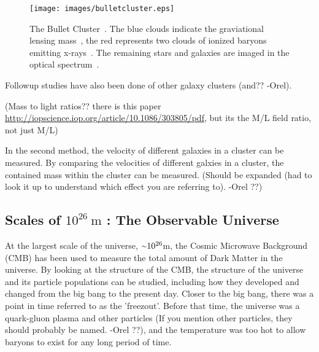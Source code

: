     \begin{figure}[ht]
      \centering
      \texttt{[image: images/bulletcluster.eps]}
      \caption[The Bullet Cluster]{
        The Bullet Cluster~\cite{bullet_cluster_combined_image}.
        The blue clouds indicate the graviational lensing mass~\cite{bullet_cluster}, the red represents two clouds of ionized baryons emitting x-rays~\cite{bullet_cluster_chandramap}.
        The remaining stars and galaxies are imaged in the optical spectrum~\cite{bullet_cluster_composite}.}
      \label{fig:bullet}
    \end{figure}

    Followup studies have also been done of other galaxy clusters {\color{red}(and?? -Orel)}.

    {\color{red}(Mass to light ratios?? there is this paper \url{http://iopscience.iop.org/article/10.1086/303805/pdf}, but its the M/L field ratio, not just M/L)}

    In the second method, the velocity of different galaxies in a cluster can be measured.
    By comparing the velocities of different galxies in a cluster, the contained mass within the cluster can be measured.
    {\color{red}(Should be expanded (had to look it up to understand which effect you are referring to). -Orel ??)}

  \subsection{Scales of $10^{26}\:\text{m}$ : The Observable Universe}\label{dm_universe}
    At the largest scale of the universe, $\nicetilde 10^{26}$m, the Cosmic Microwave Background (CMB) has been used to measure the total amount of Dark Matter in the universe.
    By looking at the structure of the CMB, the structure of the universe and its particle populations can be studied, including how they developed and changed from the big bang to the present day.
    Closer to the big bang, there was a point in time referred to as the 'freezout'.
    Before that time, the universe was a quark-gluon plasma {\color{red}and other particles (If you mention other particles, they should probably be named. -Orel ??)}, and the temperature was too hot to allow baryons to exist for any long period of time.

